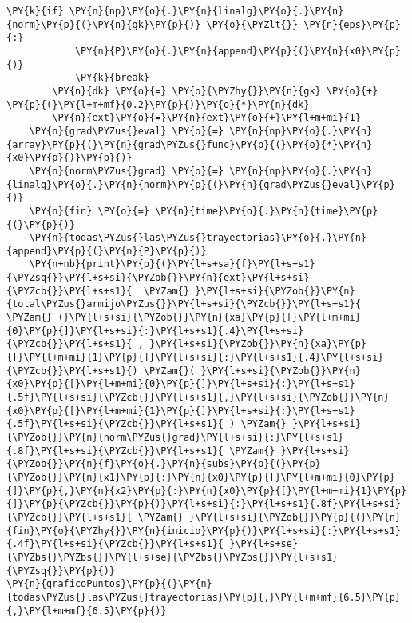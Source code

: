 \begin{itemize}
\begin{tcolorbox}[breakable, size=fbox, boxrule=1pt, pad at break*=1mm,colback=cellbackground, colframe=cellborder]
\begin{Verbatim}[commandchars=\\\{\}]
        \PY{k}{if} \PY{n}{np}\PY{o}{.}\PY{n}{linalg}\PY{o}{.}\PY{n}{norm}\PY{p}{(}\PY{n}{gk}\PY{p}{)} \PY{o}{\PYZlt{}} \PY{n}{eps}\PY{p}{:}
            \PY{n}{P}\PY{o}{.}\PY{n}{append}\PY{p}{(}\PY{n}{x0}\PY{p}{)}  
            \PY{k}{break}
        \PY{n}{dk} \PY{o}{=} \PY{o}{\PYZhy{}}\PY{n}{gk} \PY{o}{+} \PY{p}{(}\PY{l+m+mf}{0.2}\PY{p}{)}\PY{o}{*}\PY{n}{dk}
        \PY{n}{ext}\PY{o}{=}\PY{n}{ext}\PY{o}{+}\PY{l+m+mi}{1}
    \PY{n}{grad\PYZus{}eval} \PY{o}{=} \PY{n}{np}\PY{o}{.}\PY{n}{array}\PY{p}{(}\PY{n}{grad\PYZus{}func}\PY{p}{(}\PY{o}{*}\PY{n}{x0}\PY{p}{)}\PY{p}{)}
    \PY{n}{norm\PYZus{}grad} \PY{o}{=} \PY{n}{np}\PY{o}{.}\PY{n}{linalg}\PY{o}{.}\PY{n}{norm}\PY{p}{(}\PY{n}{grad\PYZus{}eval}\PY{p}{)}
    \PY{n}{fin} \PY{o}{=} \PY{n}{time}\PY{o}{.}\PY{n}{time}\PY{p}{(}\PY{p}{)}
    \PY{n}{todas\PYZus{}las\PYZus{}trayectorias}\PY{o}{.}\PY{n}{append}\PY{p}{(}\PY{n}{P}\PY{p}{)}
    \PY{n+nb}{print}\PY{p}{(}\PY{l+s+sa}{f}\PY{l+s+s1}{\PYZsq{}}\PY{l+s+si}{\PYZob{}}\PY{n}{ext}\PY{l+s+si}{\PYZcb{}}\PY{l+s+s1}{  \PYZam{} }\PY{l+s+si}{\PYZob{}}\PY{n}{total\PYZus{}armijo\PYZus{}}\PY{l+s+si}{\PYZcb{}}\PY{l+s+s1}{ \PYZam{} (}\PY{l+s+si}{\PYZob{}}\PY{n}{xa}\PY{p}{[}\PY{l+m+mi}{0}\PY{p}{]}\PY{l+s+si}{:}\PY{l+s+s1}{.4}\PY{l+s+si}{\PYZcb{}}\PY{l+s+s1}{ , }\PY{l+s+si}{\PYZob{}}\PY{n}{xa}\PY{p}{[}\PY{l+m+mi}{1}\PY{p}{]}\PY{l+s+si}{:}\PY{l+s+s1}{.4}\PY{l+s+si}{\PYZcb{}}\PY{l+s+s1}{) \PYZam{}( }\PY{l+s+si}{\PYZob{}}\PY{n}{x0}\PY{p}{[}\PY{l+m+mi}{0}\PY{p}{]}\PY{l+s+si}{:}\PY{l+s+s1}{.5f}\PY{l+s+si}{\PYZcb{}}\PY{l+s+s1}{,}\PY{l+s+si}{\PYZob{}}\PY{n}{x0}\PY{p}{[}\PY{l+m+mi}{1}\PY{p}{]}\PY{l+s+si}{:}\PY{l+s+s1}{.5f}\PY{l+s+si}{\PYZcb{}}\PY{l+s+s1}{ ) \PYZam{} }\PY{l+s+si}{\PYZob{}}\PY{n}{norm\PYZus{}grad}\PY{l+s+si}{:}\PY{l+s+s1}{.8f}\PY{l+s+si}{\PYZcb{}}\PY{l+s+s1}{ \PYZam{} }\PY{l+s+si}{\PYZob{}}\PY{n}{f}\PY{o}{.}\PY{n}{subs}\PY{p}{(}\PY{p}{\PYZob{}}\PY{n}{x1}\PY{p}{:}\PY{n}{x0}\PY{p}{[}\PY{l+m+mi}{0}\PY{p}{]}\PY{p}{,}\PY{n}{x2}\PY{p}{:}\PY{n}{x0}\PY{p}{[}\PY{l+m+mi}{1}\PY{p}{]}\PY{p}{\PYZcb{}}\PY{p}{)}\PY{l+s+si}{:}\PY{l+s+s1}{.8f}\PY{l+s+si}{\PYZcb{}}\PY{l+s+s1}{ \PYZam{} }\PY{l+s+si}{\PYZob{}}\PY{p}{(}\PY{n}{fin}\PY{o}{\PYZhy{}}\PY{n}{inicio}\PY{p}{)}\PY{l+s+si}{:}\PY{l+s+s1}{.4f}\PY{l+s+si}{\PYZcb{}}\PY{l+s+s1}{ }\PY{l+s+se}{\PYZbs{}\PYZbs{}}\PY{l+s+se}{\PYZbs{}\PYZbs{}}\PY{l+s+s1}{\PYZsq{}}\PY{p}{)}
\PY{n}{graficoPuntos}\PY{p}{(}\PY{n}{todas\PYZus{}las\PYZus{}trayectorias}\PY{p}{,}\PY{l+m+mf}{6.5}\PY{p}{,}\PY{l+m+mf}{6.5}\PY{p}{)}
\end{Verbatim}
\end{tcolorbox}

\end{itemize}